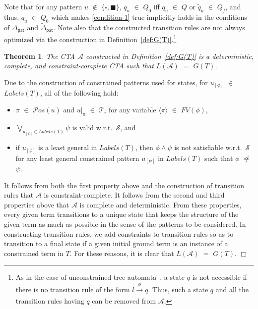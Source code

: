\documentclass[copyright,creativecommons]{eptcs}
\newcommand{\eop}{\hspace*{\fill}$\Box$}
\newtheorem{theorem}[definition]{Theorem}
{\theorembodyfont{\rmfamily}
  \newtheorem{example}[definition]{\it Example}
  \newtheorem{myproof}{\it Proof.}
}
\newenvironment{proof}{\begin{myproof}}{\eop\end{myproof}}
\newcommand{\cA}{\mathcal{A}}
\newcommand{\cS}{\mathcal{S}}
\newcommand{\FVar}{{\mathit{FV}}}
\newcommand{\Pos}{{\mathcal{P}os}}
\newcommand{\posvar}[1]{{\langle}#1{\rangle}}
\newcommand{\Terms}{{\mathcal{T}}}
\newcommand{\TwC}[2]{{#1}_{[#2]}}
\newcommand{\Labels}{{\mathit{Labels}}}
\begin{document}
Note that for any pattern $u$ $\not\in$ $\{\square,\blacksquare\}$, 
$q_u$ $\in$ $Q_0$ iff $q_u$ $\in$ $Q$ or $\tilde{q}_u$ $\in$ $Q_f$, and
thus, $q_u$ $\in$ $Q_0$ which makes \ref{condition-1} true implicitly
holds in the conditions of $\Delta_{\mathsf{pat}}$ and
$\tilde{\Delta}_{\mathsf{pat}}$.
Note also that the constructed transition rules are not always
optimized via the construction in Definition~\ref{def:G(T)}.\footnote{ As in the case of unconstrained tree automata~\cite{TATA}, 
a state $q$ is not accessible if there is no transition rule of the
form $l \xrightarrow[]{\phi} q$.
Thus, such a state $q$ and all the transition rules having $q$ can be
removed from $\cA$.}
\begin{theorem}
 \label{th:correctness}
The CTA $\cA$ constructed in Definition~\ref{def:G(T)} is a
 deterministic, complete, and constraint-complete CTA such that $L(\cA)$
 $=$ $G(T)$.
\end{theorem}
\begin{proof}
Due to the construction of constrained patterns used for states, 
for $\TwC{u}{\phi}$ $\in$ $\Labels(T)$, 
all of the following hold:
\begin{itemize}
 \item $\pi$ $\in$ $\Pos(u)$ and $u|_\pi$ $\in$ $\Terms_\square$
       for any variable $\posvar{\pi}$ $\in$ $\FVar(\phi)$, 
 \item $\bigvee_{\TwC{u}{\psi} \in \Labels(T)} \psi$ is
       valid w.r.t.\ $\cS$, and
 \item if $\TwC{u}{\phi}$ is a least general in $\Labels(T)$, then
       $\phi \wedge \psi$ is not satisfiable w.r.t.\ $\cS$ for any
       least general constrained pattern $\TwC{u}{\psi}$ in $\Labels(T)$
       such that $\phi$ $\not\bumpeq$ $\psi$.
 \end{itemize}
It follows from both the first property above and the construction of
 transition rules that $\cA$ is constraint-complete.  
It follows from the second and third properties above that $\cA$ is
 complete and deterministic. 
From these properties, every given term transitions to a unique state
 that keeps the structure of the given term as much as possible in the
 sense of the patterns to be considered. 
 In constructing transition rules, we add constraints to transition
 rules so as to transition to a final state if a given initial ground
 term is an instance of a constrained term in $T$. 
 For these reasons, it is clear that $L(\cA)$ $=$ $G(T)$.
\end{proof}
\end{document}
